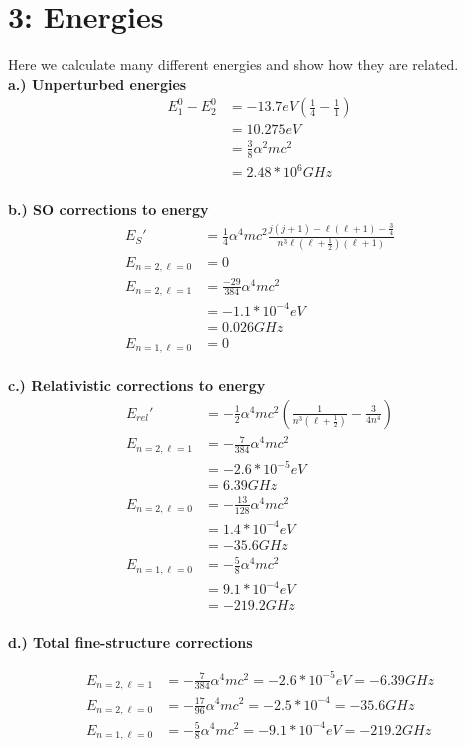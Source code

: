 \documentclass[10pt]{article} %
\begin{document}
\section{3: Energies}
Here we calculate many different energies and show how they are related.\\

\textbf{a.) Unperturbed energies}
\begin{align*}
  E_1^0 - E_2^0 &= -13.7eV\left(\frac{1}{4} - \frac{1}{1}\right)\\
  &= 10.275eV\\
  &= \frac{3}{8}\alpha^2mc^2\\
  &= 2.48 * 10^6 GHz\\
\end{align*}

\textbf{b.) SO corrections to energy}
\begin{align*}
  E_{S}' &= \frac{1}{4}\alpha^4mc^2\frac{j(j+1)
    - \ell(\ell+1) - \frac{3}{4}}{n^3\ell(\ell+\frac{1}{2})(\ell+1)}\\
  E_{n=2,\ell=0} &= 0\\
  E_{n=2,\ell=1} &= \frac{-29}{384}\alpha^4mc^2\\
  &= -1.1 *10^{-4} eV\\
  &= 0.026 GHz\\
  E_{n=1,\ell=0} &= 0\\
\end{align*}

\textbf{c.) Relativistic corrections to energy}
\begin{align*}
  E_{rel}' &= -\frac{1}{2}\alpha^4mc^2
  \left(\frac{1}{n^3(\ell+\frac{1}{2})} - \frac{3}{4n^4}\right)\\
  E_{n=2,\ell=1} &= -\frac{7}{384}\alpha^4mc^2\\
  &= -2.6*10^{-5} eV\\
  &= 6.39 GHz\\
  E_{n=2,\ell=0} &= -\frac{13}{128}\alpha^4mc^2\\
  &= 1.4*10^{-4} eV\\
  &= -35.6 GHz\\
  E_{n=1,\ell=0} &= -\frac{5}{8}\alpha^4mc^2\\
  &= 9.1*10^{-4} eV\\
  &= -219.2 GHz\\
\end{align*}

\textbf{d.) Total fine-structure corrections}

\begin{align*}
  E_{n=2,\ell=1} &= -\frac{7}{384}\alpha^4mc^2 = -2.6*10^{-5} eV = -6.39 GHz\\
  E_{n=2,\ell=0} &= -\frac{17}{96}\alpha^4mc^2 = -2.5*10^{-4} = -35.6 GHz\\
  E_{n=1,\ell=0} &= -\frac{5}{8}\alpha^4mc^2 = -9.1*10^{-4} eV = -219.2 GHz\\
\end{align*}
\end{document}
